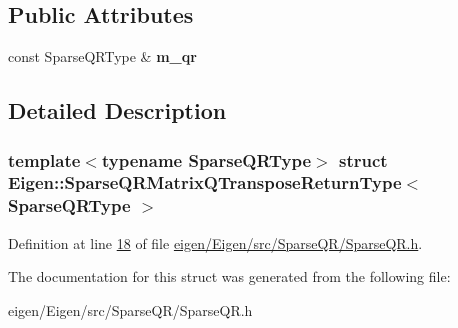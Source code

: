 \subsection*{Public Attributes}
\begin{DoxyCompactItemize}
\item 
\mbox{\label{struct_eigen_1_1_sparse_q_r_matrix_q_transpose_return_type_ae128ce846ab3e2b39884c0ab14547f1d}} 
const Sparse\+Q\+R\+Type \& {\bfseries m\+\_\+qr}
\end{DoxyCompactItemize}


\subsection{Detailed Description}
\subsubsection*{template$<$typename Sparse\+Q\+R\+Type$>$\newline
struct Eigen\+::\+Sparse\+Q\+R\+Matrix\+Q\+Transpose\+Return\+Type$<$ Sparse\+Q\+R\+Type $>$}



Definition at line \hyperlink{eigen_2_eigen_2src_2_sparse_q_r_2_sparse_q_r_8h_source_l00018}{18} of file \hyperlink{eigen_2_eigen_2src_2_sparse_q_r_2_sparse_q_r_8h_source}{eigen/\+Eigen/src/\+Sparse\+Q\+R/\+Sparse\+Q\+R.\+h}.



The documentation for this struct was generated from the following file\+:\begin{DoxyCompactItemize}
\item 
eigen/\+Eigen/src/\+Sparse\+Q\+R/\+Sparse\+Q\+R.\+h\end{DoxyCompactItemize}
